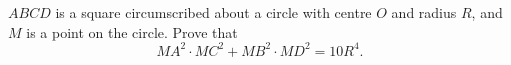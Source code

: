 $ABCD$ is a square circumscribed about a circle with centre $O$ and radius $R$, and $M$ is a point on the circle. Prove that
\[MA^2\cdot MC^2+MB^2\cdot MD^2=10R^4.\]
